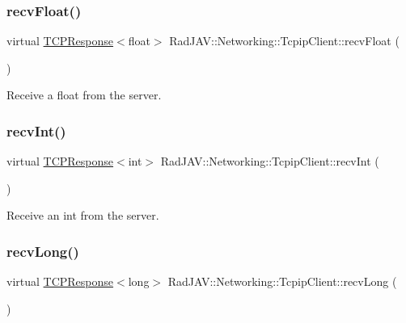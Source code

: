 \subsubsection{\texorpdfstring{recv\+Float()}{recvFloat()}}
{\footnotesize\ttfamily virtual \mbox{\hyperlink{class_rad_j_a_v_1_1_networking_1_1_t_c_p_response}{T\+C\+P\+Response}}$<$float$>$ Rad\+J\+A\+V\+::\+Networking\+::\+Tcpip\+Client\+::recv\+Float (\begin{DoxyParamCaption}{ }\end{DoxyParamCaption})\hspace{0.3cm}{\ttfamily [pure virtual]}}



Receive a float from the server. 

\mbox{\label{class_rad_j_a_v_1_1_networking_1_1_tcpip_client_a603ea8bc629629e78de34a9fed9ae762}} 
\subsubsection{\texorpdfstring{recv\+Int()}{recvInt()}}
{\footnotesize\ttfamily virtual \mbox{\hyperlink{class_rad_j_a_v_1_1_networking_1_1_t_c_p_response}{T\+C\+P\+Response}}$<$int$>$ Rad\+J\+A\+V\+::\+Networking\+::\+Tcpip\+Client\+::recv\+Int (\begin{DoxyParamCaption}{ }\end{DoxyParamCaption})\hspace{0.3cm}{\ttfamily [pure virtual]}}



Receive an int from the server. 

\mbox{\label{class_rad_j_a_v_1_1_networking_1_1_tcpip_client_a3c569e6a3da7e9925647af11a2f6e67e}} 
\subsubsection{\texorpdfstring{recv\+Long()}{recvLong()}}
{\footnotesize\ttfamily virtual \mbox{\hyperlink{class_rad_j_a_v_1_1_networking_1_1_t_c_p_response}{T\+C\+P\+Response}}$<$long$>$ Rad\+J\+A\+V\+::\+Networking\+::\+Tcpip\+Client\+::recv\+Long (\begin{DoxyParamCaption}{ }\end{DoxyParamCaption})\hspace{0.3cm}{\ttfamily [pure virtual]}}



